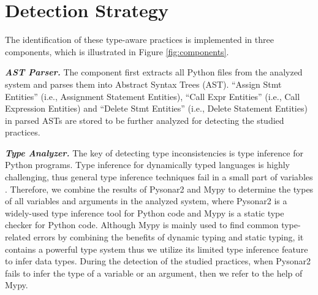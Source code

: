 \section{Detection Strategy}\label{sec:detection}

The identification of these type-aware practices is implemented in three components, which is illustrated in Figure \ref{fig:components}.

\noindent\textbf{\emph{AST Parser.}} The component first extracts all Python files from the analyzed system and parses them into Abstract Syntax Trees (AST). ``Assign Stmt Entities'' (i.e., Assignment Statement Entities), ``Call Expr Entities'' (i.e., Call Expression Entities) and ``Delete Stmt Entities'' (i.e., Delete Statement Entities) in parsed ASTs are stored to be further analyzed for detecting the studied practices.

\noindent\textbf{\emph{Type Analyzer.}} The key of detecting type inconsistencies is type inference for Python programs. Type inference for dynamically typed languages is highly challenging, thus general type inference techniques fail in a small part of variables \cite{b14}. Therefore, we combine the results of Pysonar2\cite{b41} and Mypy\cite{b42} to determine the types of all variables and arguments in the analyzed system, where Pysonar2 is a widely-used type inference tool for Python code and Mypy is a static type checker for Python code. Although Mypy is mainly used to find common type-related errors by combining the benefits of dynamic typing and static typing, it contains a powerful type system thus we utilize its limited type inference feature to infer data types. During the detection of the studied practices, when Pysonar2 fails to infer the type of a variable or an argument, then we refer to the help of Mypy.

